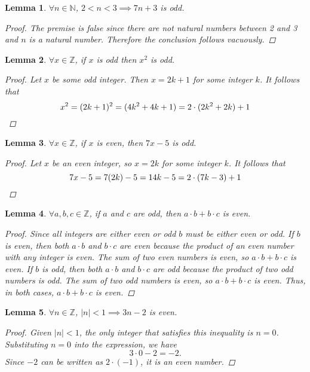 \documentclass[]{article}
\newtheorem{lemmax}{Lemma}[section]
\begin{document}
\begin{lemmax}
$\forall n \in \mathbb{N}$, $2 < n < 3 \implies 7n + 3$ is odd.
\begin{proof}
The premise is false since there are not natural numbers between 2 and 3 and $n$ is a natural number. 
Therefore the conclusion follows vacuously. 
\end{proof}
\end{lemmax}

\begin{lemmax}
$\forall x \in \mathbb{Z}$, if $x$ is odd then $x^2$ is odd.
\begin{proof}
Let $x$ be some odd integer. Then $x = 2k + 1$ for some integer $k$. It follows that
\[ x^2 = (2k + 1)^2 = (4k^2 + 4k + 1) = 2 \cdot (2k^2 + 2k) + 1 \qedhere \]
\end{proof}
\end{lemmax}

\begin{lemmax}
$\forall x \in \mathbb{Z}$, if $x$ is even, then $7x - 5$ is odd.
\begin{proof}
Let $x$ be an even integer, so $x = 2k$ for some integer $k$. It follows that
\[
7x - 5 = 7(2k) - 5 = 14k - 5 = 2 \cdot (7k - 3) + 1 \qedhere
\]
\end{proof}
\end{lemmax}

\begin{lemmax}
$\forall a, b, c \in \mathbb{Z}$, if $a$ and $c$ are odd, then $a \cdot b + b \cdot c$ is even.
\begin{proof}
Since all integers are either even or odd $b$ must be either even or odd. If $b$ is even, then both $a \cdot b$ and $b \cdot c$ are even because the product of an even number with any integer is even. The sum of two even numbers is even, so $a \cdot b + b \cdot c$ is even.
If $b$ is odd, then both $a \cdot b$ and $b \cdot c$ are odd because the product of two odd numbers is odd. The sum of two odd numbers is even, so $a \cdot b + b \cdot c$ is even.
Thus, in both cases, $a \cdot b + b \cdot c$ is even.
\end{proof}
\end{lemmax}

\begin{lemmax}
$\forall n \in \mathbb{Z}$, $|n| < 1 \implies 3n - 2$ is even.
\begin{proof}
Given $|n| < 1$, the only integer that satisfies this inequality is $n = 0$. Substituting $n = 0$ into the expression, we have
\[
3 \cdot 0 - 2 = -2.
\]
Since $-2$ can be written as $2 \cdot (-1)$, it is an even number.
\end{proof}
\end{lemmax}
\end{document}
